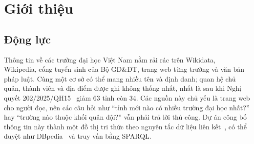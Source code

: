 \documentclass[12pt,a4paper]{article}
\begin{document}
\begin{abstract}
\noindent Thông tin về các cơ sở giáo dục đại học Việt Nam đang phân tán trên nhiều nguồn không đồng nhất và chưa có dạng
máy đọc được với ngữ nghĩa thống nhất. Báo cáo trình bày VN-Edu LOD, một bộ dữ liệu liên kết mở cho miền này, được xây
dựng theo năm bước của quy trình công bố Linked Data. Chúng tôi thiết kế ontology OWL~2 gồm \metricClasses{} lớp và 69
thuộc tính, nằm trong hồ sơ OWL~2~RL, dùng lớp định nghĩa và chuỗi thuộc tính để phân loại cơ sở và quy đổi địa giới hành
chính sau đợt sắp xếp năm 2025. Dữ liệu từ Wikidata, Wikipedia tiếng Việt, cổng tuyển sinh của Bộ GD\&ĐT, ROR, DBpedia
và các bảng tham chiếu có trích dẫn văn bản pháp luật (ảnh chụp ngày 09/10/2026) được tích hợp bằng một pipeline
Bronze--Silver--Gold, có ghi nguồn tới từng giá trị. Bản phát hành gồm \metricUnionTriples{} triple, mô tả
\metricInstitutions{} cơ sở giáo dục và \metricPeople{} cá nhân, với 2{,}310 liên kết \texttt{owl:sameAs} tới Wikidata,
DBpedia, ROR và GeoNames. Đồ thị không vi phạm ràng buộc SHACL nào. Trên một mẫu ngẫu nhiên phân tầng gồm 100 liên kết,
không phát hiện liên kết sai (khoảng tin cậy Wilson 95\% cho độ chính xác: 96,3--100\%). Dữ liệu được công bố qua URI tra
cứu được và một SPARQL endpoint chỉ đọc.

\medskip\noindent\textbf{Từ khoá:} Linked Open Data, ontology, OWL 2 RL, SHACL, SPARQL, đồ thị tri thức.
\end{abstract}
\clearpage
{\setcounter{tocdepth}{2}\tableofcontents}
\clearpage
{}

\section{Giới thiệu}\label{sec:intro}

\subsection{Động lực}
Thông tin về các trường đại học Việt Nam nằm rải rác trên Wikidata, Wikipedia, cổng tuyển sinh của Bộ GD\&ĐT, trang web
từng trường và văn bản pháp luật. Cùng một cơ sở có thể mang nhiều tên và định danh; quan hệ chủ quản, thành viên và địa
điểm được ghi không thống nhất, nhất là sau khi Nghị quyết 202/2025/QH15~\cite{vn2025nq202} giảm 63 tỉnh còn 34. Các
nguồn này chủ yếu là trang web cho người đọc, nên các câu hỏi như ``tỉnh mới nào có nhiều trường đại học nhất?'' hay
``trường nào thuộc khối quân đội?'' vẫn phải trả lời thủ công. Dự án công bố thông tin này thành một đồ thị tri thức theo
nguyên tắc dữ liệu liên kết~\cite{bizer2009linked,heath2011linked}, có thể duyệt như DBpedia~\cite{lehmann2015dbpedia}
và truy vấn bằng SPARQL.
\end{document}
